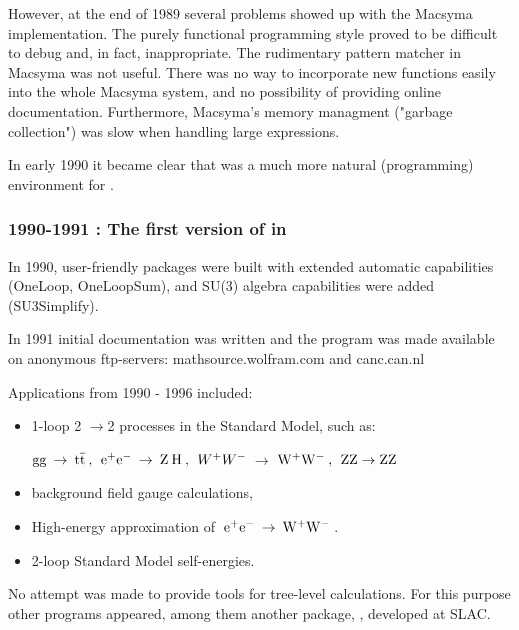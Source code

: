 However, at the end of 1989 several problems showed up with the Macsyma implementation. The purely functional programming style proved to be difficult to debug and, in fact, inappropriate. The rudimentary pattern matcher in Macsyma was not useful. There was no way to incorporate new functions easily into the whole Macsyma system, and no possibility of providing online documentation. Furthermore, Macsyma's memory managment ("garbage collection") was slow when handling large expressions.

In early 1990 it became clear that \mma was a much more natural (programming) environment for \fc.

\subsubsection*{1990-1991 : The first version  of \fc in \mma}

In 1990, user-friendly  packages were built with extended automatic capabilities (OneLoop, OneLoopSum), and SU(3) algebra capabilities
were added (SU3Simplify).

In 1991 initial documentation was written and the program was made available on anonymous ftp-servers: mathsource.wolfram.com and canc.can.nl

Applications from 1990 - 1996  included:

\begin{itemize}

\item 1-loop 2 \(\rightarrow \)2 processes in the Standard
Model, such as:

\({\rm gg}\> \rightarrow \> 
{\rm t \overline{t}} \> , \> \>
{{\rm e}^+}{{\rm e}^-}\> \rightarrow \> {\rm Z}\> {\rm H}\>, \> \>
{W^+}{W^-}\> \)\(\rightarrow \) \({{\rm W}^+}{{\rm W}^-}\>, \> \>
{\rm ZZ} \rightarrow {\rm ZZ} \)

\item background field gauge calculations,

\item High-energy approximation of \(\>{{\rm e}^+}
{{\rm e}^-}\> \rightarrow \> {{\rm W}^+}{{\rm W}^-}\> \).

\item  2-loop Standard Model self-energies.

\end{itemize}

No attempt was made to provide tools for tree-level calculations. For this purpose other programs appeared, among them another  \mma package, \hip \cite{yeh}, developed at SLAC.

